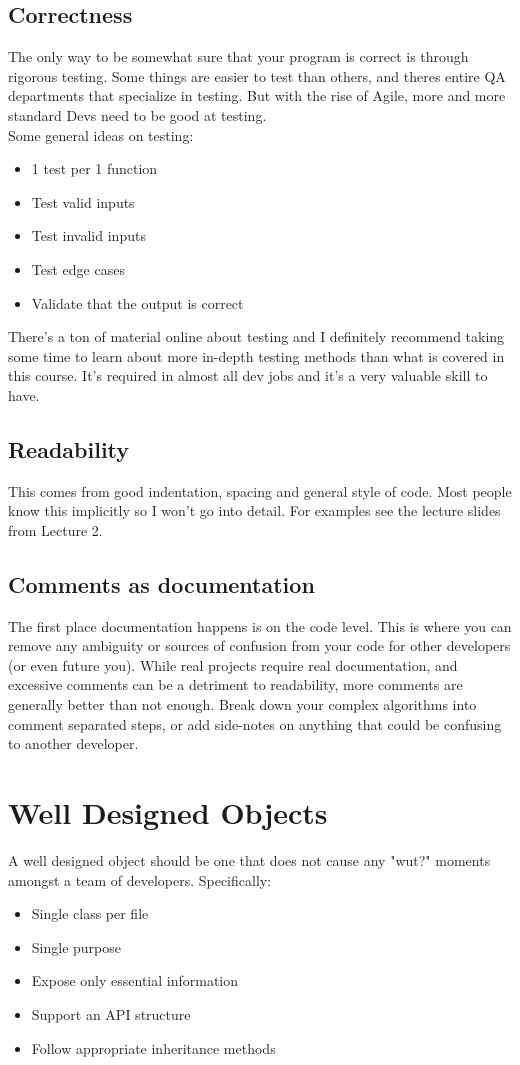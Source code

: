 \documentclass[12pt]{article}
\theoremstyle{definition}
\begin{document}
\subsection{Correctness}
The only way to be somewhat sure that your program is correct is through rigorous testing. Some things are easier to test than others, and theres entire QA departments that specialize in testing. But with the rise of Agile, more and more standard Devs need to be good at testing.
\\ \linebreak
Some general ideas on testing:
\begin{itemize}
	\item 1 test per 1 function
	\item Test valid inputs
	\item Test invalid inputs
	\item Test edge cases
	\item Validate that the output is correct
\end{itemize}
There's a ton of material online about testing and I definitely recommend taking some time to learn about more in-depth testing methods than what is covered in this course. It's required in almost all dev jobs and it's a very valuable skill to have.

\subsection{Readability}
This comes from good indentation, spacing and general style of code. Most people know this implicitly so I won't go into detail. For examples see the lecture slides from Lecture 2. 

\subsection{Comments as documentation}
The first place documentation happens is on the code level. This is where you can remove any ambiguity or sources of confusion from your code for other developers (or even future you). While real projects require real documentation, and excessive comments can be a detriment to readability, more comments are generally better than not enough. Break down your complex algorithms into comment separated steps, or add side-notes on anything that could be confusing to another developer.

\section{Well Designed Objects}
A well designed object should be one that does not cause any "wut?" moments amongst a team of developers. Specifically:
\begin{itemize}
	\item Single class per file
	\item Single purpose
	\item Expose only essential information
	\item Support an API structure
	\item Follow appropriate inheritance methods
\end{itemize}
\end{document}

